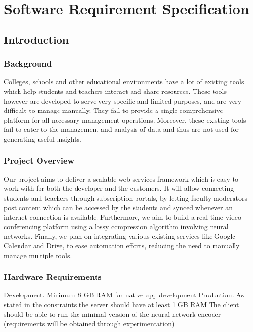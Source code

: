 \chapter{Software Requirement Specification}

\section{Introduction}

\subsection{Background}

Colleges, schools and other educational environments have a lot of existing tools 
which help students and teachers interact and share resources.
These tools however are developed to serve very specific and limited purposes, and are very difficult to 
manage manually. They fail to provide a single comprehensive platform for all 
necessary management operations. Moreover, these existing tools fail to cater to the 
management and analysis of data and thus are not used for generating useful 
insights.

\subsection{Project Overview}

Our project aims to deliver a scalable web services framework which is easy to work 
with for both the developer and the customers. It will allow connecting students and 
teachers through subscription portals, by letting faculty moderators post content 
which can be accessed by the students and synced whenever an internet connection 
is available. Furthermore, we aim to build a real-time video conferencing platform 
using a lossy compression algorithm involving neural networks. Finally, we plan on 
integrating various existing services like Google Calendar and Drive, to ease 
automation efforts, reducing the need to manually manage multiple tools.

\subsection{Hardware Requirements}

Development:
Minimum 8 GB RAM for native app development
Production:
As stated in the constraints the server should have at least 1 GB RAM  
The client should be able to run the minimal version of the neural network encoder 
(requirements will be obtained through experimentation)

